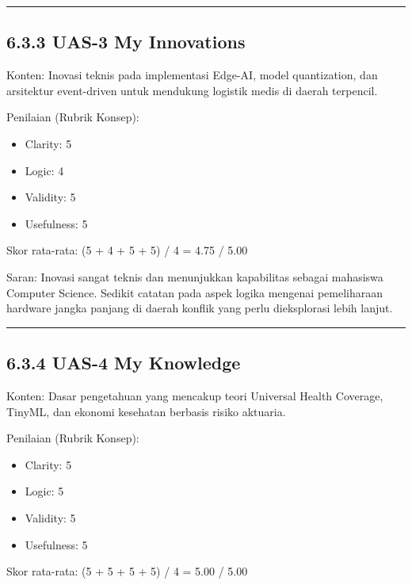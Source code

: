 \documentclass[
  letterpaper,
  DIV=11,
  numbers=noendperiod]{scrreprt}
\begin{document}
\begin{center}\rule{0.5\linewidth}{0.5pt}\end{center}

\subsection{6.3.3 UAS-3 My Innovations}\label{uas-3-my-innovations-1}

Konten: Inovasi teknis pada implementasi Edge-AI, model quantization,
dan arsitektur event-driven untuk mendukung logistik medis di daerah
terpencil.

Penilaian (Rubrik Konsep):

\begin{itemize}
\item
  Clarity: 5
\item
  Logic: 4
\item
  Validity: 5
\item
  Usefulness: 5
\end{itemize}

Skor rata-rata: (5 + 4 + 5 + 5) / 4 = 4.75 / 5.00

Saran: Inovasi sangat teknis dan menunjukkan kapabilitas sebagai
mahasiswa Computer Science. Sedikit catatan pada aspek logika mengenai
pemeliharaan hardware jangka panjang di daerah konflik yang perlu
dieksplorasi lebih lanjut.

\begin{center}\rule{0.5\linewidth}{0.5pt}\end{center}

\subsection{6.3.4 UAS-4 My Knowledge}\label{uas-4-my-knowledge-1}

Konten: Dasar pengetahuan yang mencakup teori Universal Health Coverage,
TinyML, dan ekonomi kesehatan berbasis risiko aktuaria.

Penilaian (Rubrik Konsep):

\begin{itemize}
\item
  Clarity: 5
\item
  Logic: 5
\item
  Validity: 5
\item
  Usefulness: 5
\end{itemize}

Skor rata-rata: (5 + 5 + 5 + 5) / 4 = 5.00 / 5.00
\end{document}
